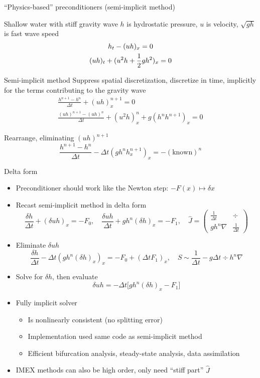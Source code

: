 \begin{frame}[shrink=10]{``Physics-based'' preconditioners (semi-implicit method)}
  \begin{block}{Shallow water with stiff gravity wave}
    $h$ is hydrostatic pressure, $u$ is velocity, $\sqrt{gh}$ is fast wave speed
    \begin{gather*}
      h_t - (uh)_x = 0 \\
      (uh)_t + (u^2h + {\frac 1 2} gh^2)_x = 0
    \end{gather*}
  \end{block}
  \vspace{-3em}
  \begin{block}{Semi-implicit method}
    Suppress spatial discretization, discretize in time, implicitly for the terms contributing to the gravity wave
    \begin{gather*}
      \frac{h^{n+1} - h^n}{\Delta t} + (uh)_x^{n+1} = 0 \\
      \frac{(uh)^{n+1} - (uh)^{n}}{\Delta t} + (u^2h)_x^{n} + g(h^n h^{n+1})_x = 0
    \end{gather*}

    Rearrange, eliminating $(uh)^{n+1}$
    \[ \frac{h^{n+1} - h^n}{\Delta t} - \Delta t(gh^n h_x^{n+1})_x = -(\text{known})^n \]
  \end{block}
\end{frame}

\begin{frame}[shrink=1]{Delta form}
  \begin{itemize}
  \item Preconditioner should work like the Newton step: $-F(x) \mapsto \delta x$
  \item Recast semi-implicit method in delta form
    \[ \frac{\delta h}{\Delta t} + (\delta uh)_x = -F_0, \quad \frac{\delta uh}{\Delta t} + g h^n (\delta h)_x = -F_1,
    \quad \widehat{J} =
    \begin{pmatrix}
      \frac{1}{\Delta t} & \div \\
      g h^n \nabla & \frac{1}{\Delta t}
    \end{pmatrix}
    \]
  \item Eliminate $\delta uh$
    \[ \frac{\delta h}{\Delta t} - \Delta t(gh^n (\delta h)_x)_x = -F_0 + (\Delta t F_1)_x,
    \quad S \sim \frac{1}{\Delta t} - g \Delta t \div h^n \nabla
    \]
  \item Solve for $\delta h$, then evaluate
    \[ \delta uh = - \Delta t \big[ gh^n (\delta h)_x - F_1 \big] \]
  \item Fully implicit solver
    \begin{itemize}
    \item Is nonlinearly consistent (no splitting error)
    \item Implementation used same code as semi-implicit method
    \item Efficient bifurcation analysis, steady-state analysis, data assimilation
    \end{itemize}
  \item IMEX methods can also be high order, only need ``stiff part'' $\widehat J$
  \end{itemize}
\end{frame}
